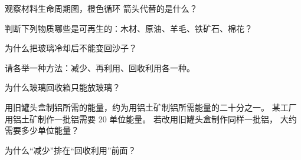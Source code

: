 \begin{exercise}[$\star$]\label{exo:g5:raw-materials-and-recycling:5}
观察材料生命周期图，橙色循环
箭头代替的是什么？
\end{exercise}

\begin{exercise}[$\star$]\label{exo:g5:raw-materials-and-recycling:6}
判断下列物质哪些是可再生的：木材、原油、羊毛、铁矿石、棉花？
\end{exercise}

\begin{exercise}[$\star$]\label{exo:g5:raw-materials-and-recycling:7}
为什么把玻璃冷却后不能变回沙子？
\end{exercise}

\begin{exercise}[$\star$]\label{exo:g5:raw-materials-and-recycling:8}
请各举一种方法：减少、再利用、回收利用各一种。
\end{exercise}

\begin{exercise}[$\star$]\label{exo:g5:raw-materials-and-recycling:9}
为什么玻璃回收箱只能放玻璃？
\end{exercise}

\begin{exercise}[$\star\star$]\label{exo:g5:raw-materials-and-recycling:10}
用旧罐头盒制铝所需的能量，约为用铝土矿制铝所需能量的二十分之一。
某工厂用铝土矿制作一批铝需要 20 单位能量。
若改用旧罐头盒制作同样一批铝，
大约需要多少单位能量？
\end{exercise}

\begin{exercise}[$\star\star$]\label{exo:g5:raw-materials-and-recycling:11}
为什么“减少”排在“回收利用”前面？
\end{exercise}
